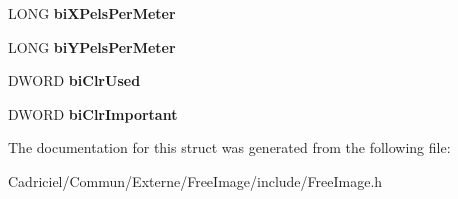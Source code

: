 \begin{DoxyCompactItemize}
\item 
L\+O\+NG {\bfseries bi\+X\+Pels\+Per\+Meter}\hypertarget{structtag_b_i_t_m_a_p_i_n_f_o_h_e_a_d_e_r_ae363738b6e92248a7be41f4e7ed55c54}{}\label{structtag_b_i_t_m_a_p_i_n_f_o_h_e_a_d_e_r_ae363738b6e92248a7be41f4e7ed55c54}

\item 
L\+O\+NG {\bfseries bi\+Y\+Pels\+Per\+Meter}\hypertarget{structtag_b_i_t_m_a_p_i_n_f_o_h_e_a_d_e_r_ac6226594275d045ff0d03849945d920f}{}\label{structtag_b_i_t_m_a_p_i_n_f_o_h_e_a_d_e_r_ac6226594275d045ff0d03849945d920f}

\item 
D\+W\+O\+RD {\bfseries bi\+Clr\+Used}\hypertarget{structtag_b_i_t_m_a_p_i_n_f_o_h_e_a_d_e_r_adbf6bd52839895672030a734d2ae752f}{}\label{structtag_b_i_t_m_a_p_i_n_f_o_h_e_a_d_e_r_adbf6bd52839895672030a734d2ae752f}

\item 
D\+W\+O\+RD {\bfseries bi\+Clr\+Important}\hypertarget{structtag_b_i_t_m_a_p_i_n_f_o_h_e_a_d_e_r_a637282b108fc8ac3bdf41479f9931ccb}{}\label{structtag_b_i_t_m_a_p_i_n_f_o_h_e_a_d_e_r_a637282b108fc8ac3bdf41479f9931ccb}

\end{DoxyCompactItemize}


The documentation for this struct was generated from the following file\+:\begin{DoxyCompactItemize}
\item 
Cadriciel/\+Commun/\+Externe/\+Free\+Image/include/Free\+Image.\+h\end{DoxyCompactItemize}
